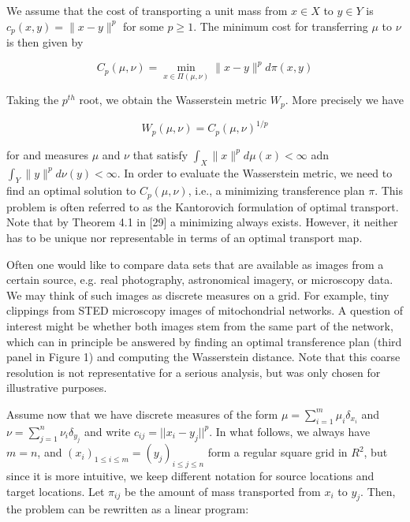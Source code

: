We assume that the cost of transporting a unit mass from $x \in X$ to $y \in Y$ is $c_p(x,y) = \|x-y\|^p$ for some $p \geq 1$. The minimum cost for transferring $\mu$ to $\nu$ is then given by 

\begin{equation}
  C_p (\mu, \nu) = \min_{x \in \Pi(\mu,\nu)} \|x-y\|^p d\pi(x,y)
\end{equation}

Taking the $p^{th}$ root, we obtain the Wasserstein metric $W_p$. More precisely we have 

\begin{equation}
  W_p(\mu, \nu) = C_p(\mu, \nu)^{1/p}
\end{equation}

for and measures $\mu$ and $\nu$ that satisfy $\int_{X}\|x\|^{p} d \mu(x)<\infty$ adn $\int_{Y}\|y\|^{p} d \nu(y)<\infty$. In order to evaluate the Wasserstein metric, we need to find an optimal solution to $C_p(\mu,\nu)$, i.e., a minimizing transference plan $\pi$. This problem is often referred to as the Kantorovich formulation of optimal transport. Note that by Theorem 4.1 in [29] a minimizing always exists. However, it neither has to be unique nor representable in terms of an optimal transport map.

Often one would like to compare data sets that are available as images from a certain source, e.g. real photography, astronomical imagery, or microscopy data. We may think of such images as discrete measures on a grid. For example, tiny clippings from STED microscopy images of mitochondrial networks. A question of interest might be whether both images stem from the same part of the network, which can in principle be answered by finding an optimal transference plan (third panel in Figure 1) and computing the Wasserstein distance. Note that this coarse resolution is not representative for a serious analysis, but was only chosen for illustrative purposes.

Assume now that we have discrete measures of the form $\mu = \sum_{i=1}^m \mu_i \delta_{x_i}$ and $\nu = \sum_{j = 1}^n \nu_i \delta_{y_j}$ and write $c_{ij} = ||x_i - y_j||^p$. In what follows, we always have $m = n$, and $(x_i)_{1 \leq i \leq m} = (y_j)_{i\leq j \leq n}$ form a regular square grid in $R^2$, but since it is more intuitive, we keep different notation for source locations and target locations. Let $\pi_{ij}$ be the amount of mass transported from $x_i$ to $y_j$. Then, the problem can be rewritten as a linear program: 

